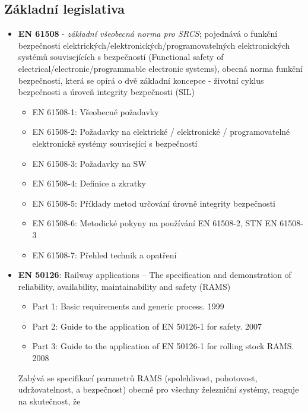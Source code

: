     \subsection{Základní legislativa}
      \begin{itemize}
        \item \textbf{EN 61508} - \emph{základní všeobecná norma pro SRCS}; pojednává o funkční
              bezpečnosti elektrických/elektronických/programovatelných elektronických systémů
              souvisejících s bezpečností (Functional safety of electrical/electronic/programmable
              electronic systems), obecná norma funkční bezpečnosti, která se opírá o dvě základní
              koncepce - životní cyklus bezpečnosti a úroveň integrity bezpečnosti (SIL)
              \begin{itemize}
                \item EN 61508-1: Všeobecné požadavky
                \item EN 61508-2: Požadavky na elektrické / elektronické / programovatelné
                                  elektronické systémy související s bezpečností
                \item EN 61508-3: Požadavky na SW
                \item EN 61508-4: Definice a zkratky
                \item EN 61508-5: Příklady metod určování úrovně integrity bezpečnosti
                \item EN 61508-6: Metodické pokyny na používání EN 61508-2, STN EN 61508-3
                \item EN 61508-7: Přehled technik a opatření
              \end{itemize}
        \item \textbf{EN 50126}: Railway applications – The specification and demonstration of
              reliability, availability, maintainability and safety (RAMS)
              \begin{itemize}
                \item Part 1: Basic requirements and generic process. 1999
                \item Part 2: Guide to the application of EN 50126-1 for safety. 2007
                \item Part 3: Guide to the application of EN 50126-1 for rolling stock RAMS. 2008  
              \end{itemize}
              Zabývá se specifikací parametrů RAMS (spolehlivost, pohotovost, udržovatelnost,
              a bezpečnost) obecně pro všechny železniční systémy, reaguje na skutečnost, že

\end{itemize}
